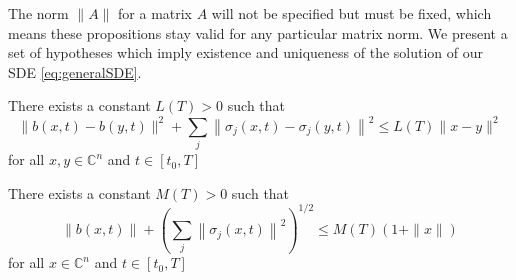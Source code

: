 The norm $ \|A\| $ for a matrix $ A $ will not be specified but must be fixed, which means these propositions stay valid for any particular matrix norm. We present a set of hypotheses which imply existence and uniqueness of the solution of our SDE \eqref{eq:generalSDE}.
\begin{hypothesis}\label{hypo:GlobalLip} There exists a constant $L(T)>0$ such that
	\[ \|b(x, t)-b(y, t)\|^{2}+\sum_{j}\left\|\sigma_{j}(x, t)-\sigma_{j}(y, t)\right\|^{2} \leq L(T)\|x-y\|^{2} \] for all $x, y \in \mathbb{C}^{n}$ and $t \in\left[t_{0}, T\right]$
\end{hypothesis}
\begin{hypothesis}\label{hypo:LinearGrowth}
	There exists a constant $M(T)>0$ such that
	\[ \|b(x, t)\|+\left(\sum_{j}\left\|\sigma_{j}(x, t)\right\|^{2}\right)^{1 / 2} \leq M(T)(1+\|x\|) \] for all $x \in \mathbb{C}^{n}$ and $t \in\left[t_{0}, T\right]$
\end{hypothesis}


